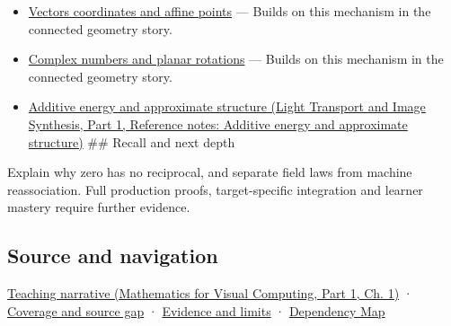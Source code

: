 \begin{itemize}
\item
  \hyperref[appendix-0659864c0aa3]{Vectors coordinates and affine points} --- Builds on this mechanism in the connected geometry story.
\item
  \hyperref[appendix-f77eadcc4a93]{Complex numbers and planar rotations} --- Builds on this mechanism in the connected geometry story.
\item
  \href{../04-Light-Transport-and-Image-Synthesis-P01/main.pdf\#appendix-b0732b22e7d6}{Additive energy and approximate structure (Light Transport and Image Synthesis, Part 1, Reference notes: Additive energy and approximate structure)} \#\# Recall and next depth
\end{itemize}

Explain why zero has no reciprocal, and separate field laws from machine reassociation. Full production proofs, target-specific integration and learner mastery require further evidence.

\subsection{Source and navigation}\label{appendix-52051ad550fe-source-and-navigation}

\hypertarget{appendix-52051ad550fe-source-and-navigation}{}

\href{../02-Mathematics-for-Visual-Computing-P01/main.pdf\#01-foundations-i-ch017-numbers-become-a-system-of-permitted-operations}{Teaching narrative (Mathematics for Visual Computing, Part 1, Ch. 1)} · \hyperref[appendix-fd090d982a15-phase-6---parts-501-600]{Coverage and source gap} · \hyperref[appendix-a103e7846d21-phase-6---source-analysis-and-verification]{Evidence and limits} · \hyperref[appendix-4ad47bdd269a]{Dependency Map}
